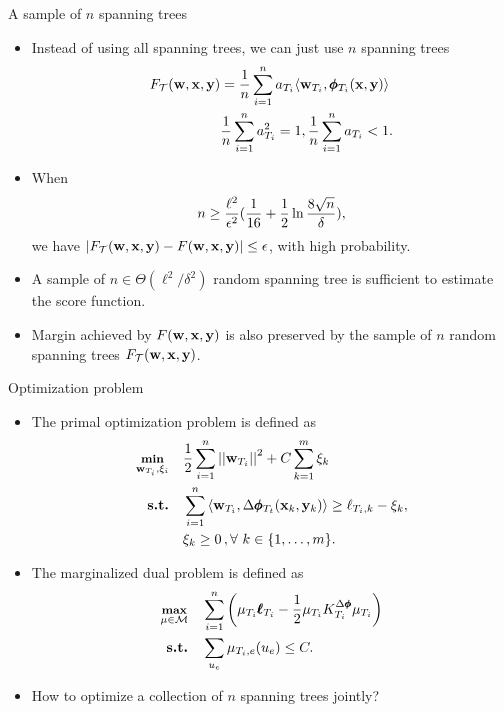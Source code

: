 \documentclass[first=dgreen,second=purple,logo=yellowexc]{aaltoslides}
\begin{document}
\begin{frame}{A sample of $n$ spanning trees}
	\begin{itemize}\footnotesize
		\item Instead of using all spanning trees, we can just use $n$ spanning trees
		\begin{align*}\footnotesize
			F_{\mathcal{T}}(\mathbf {w},\mathbf {x},\mathbf {y}) &= \frac{1}{n}\sum_{i=1}^{n}a_{T_i}\langle \mathbf {w}_{T_i}, \pmb \phi_{T_i}(\mathbf {x},\mathbf {y}) \rangle\\
			  &\frac{1}{n}\sum_{i=1}^{n}a_{T_i}^2=1,  \frac{1}{n}\sum_{i=1}^{n}a_{T_i}<1.
		\end{align*}
		\item When
		\begin{align*}\footnotesize
			n\ge\frac{\ell^2}{\epsilon^2}(\frac{1}{16}+\frac{1}{2}\ln\frac{8\sqrt{n}}{\delta}),
		\end{align*}
		we have $|F_{\mathcal{T}}(\mathbf {w},\mathbf {x},\mathbf {y})-F(\mathbf {w},\mathbf {x},\mathbf {y})|\le\epsilon$, with high probability.
		\item A sample of $n\in\Theta(\ell^2/\delta^2)$ random spanning tree is sufficient to estimate the score function.
		\item Margin achieved by $F(\mathbf {w},\mathbf {x},\mathbf {y})$ is also preserved by the sample of $n$ random spanning trees $F_{\mathcal{T}}(\mathbf {w},\mathbf {x},\mathbf {y})$.
	\end{itemize}
\end{frame}


\begin{frame}{Optimization problem}
	\begin{itemize}\footnotesize
		\item The primal optimization problem is defined as
		\begin{align*}\footnotesize
			\underset{\mathbf {w}_{T_i},\xi_i}{\textbf{min}} & \quad \frac{1}{2}\sum_{i=1}^{n}\left|\left| \mathbf {w}_{T_i} \right|\right|^2 + C\sum_{k=1}^{m}\xi_k\\
			\textbf{s.t.} & \quad \sum_{i=1}^{n}{ \langle \mathbf {w}_{T_i}, \Delta\pmb \phi_{T_t}(\mathbf {x}_k,\mathbf {y}_k) \rangle}  \geq \ell_{T_i,k} -  \xi_k, \\
			& \quad \xi_k\ge0\, , \forall\ k \in \{ 1,\dots,m \}.
		\end{align*}
		\item The marginalized dual problem is defined as
		\begin{align*}\footnotesize
			\underset{\mathbf {\mu}\in\mathcal{M}}{\textbf{max}} & \quad \sum_{i=1}^{n}\left( \mathbf {\mu}_{T_i}\pmb {\ell}_{T_i} - \frac{1}{2}\mathbf {\mu}_{T_i}K^{\Delta\pmb \phi}_{T_i}\mathbf {\mu}_{T_i}\right)\\
			\textbf{s.t.} & \quad \sum_{u_e}\mathbf {\mu}_{T_i,e}(u_e)\le C.
		\end{align*}
		\item How to optimize a collection of $n$ spanning trees jointly?
	\end{itemize}
\end{frame}
\end{document}

